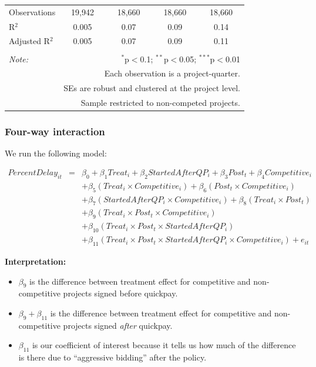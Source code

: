 \documentclass[
]{article}
\providecommand{\tightlist}{%
  \setlength{\itemsep}{0pt}\setlength{\parskip}{0pt}}
\begin{document}
\begin{table}[H]
\begin{tabular}{@{\extracolsep{-2pt}}lcccc}
Observations & 19,942 & 18,660 & 18,660 & 18,660 \\ 
R$^{2}$ & 0.005 & 0.07 & 0.09 & 0.14 \\ 
Adjusted R$^{2}$ & 0.005 & 0.07 & 0.09 & 0.11 \\ 
\hline 
\hline \\[-1.8ex] 
\textit{Note:}  & \multicolumn{4}{r}{$^{*}$p$<$0.1; $^{**}$p$<$0.05; $^{***}$p$<$0.01} \\ 
 & \multicolumn{4}{r}{Each observation is a project-quarter.} \\ 
 & \multicolumn{4}{r}{SEs are robust and clustered at the project level.} \\ 
 & \multicolumn{4}{r}{Sample restricted to non-competed projects.} \\ 
\end{tabular} 
\end{table}

\hypertarget{four-way-interaction}{%
\subsubsection{Four-way interaction}\label{four-way-interaction}}

We run the following model:

\[\begin{aligned} PercentDelay_{it} &=& \beta_0 +\beta_1 Treat_i+ \beta_2 StartedAfterQP_i+ \beta_3 Post_t+ \beta_4 Competitive_i\\ && +  \beta_5 (Treat_i \times Competitive_i) + \beta_6 (Post_t \times Competitive_i)\\ && +  \beta_7 (StartedAfterQP_i \times Competitive_i) +\beta_8 (Treat_i \times Post_t)\\ && + \beta_9 (Treat_i \times Post_t \times Competitive_i) \\ && + \beta_{10} (Treat_i \times Post_t \times StartedAfterQP_i )\\ && + \beta_{11} (Treat_i \times Post_t \times StartedAfterQP_i \times Competitive_i) + e_{it} \end{aligned}\]

\textbf{Interpretation:}

\begin{itemize}
\tightlist
\item
  \(\beta_9\) is the difference between treatment effect for competitive
  and non-competitive projects signed before quickpay.
\item
  \(\beta_9 + \beta_{11}\) is the difference between treatment effect
  for competitive and non-competitive projects signed \emph{after}
  quickpay.
\item
  \(\beta_{11}\) is our coefficient of interest because it tells us how
  much of the difference is there due to ``aggressive bidding'' after
  the policy.
\end{itemize}
\end{document}
